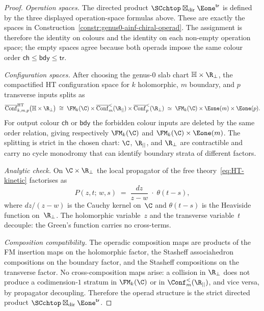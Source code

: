 \begin{proof}
\emph{Operation spaces.}
The directed product
$\SCchtop\boxtimes_{\mathrm{dir}}\Eone^{\mathsf{tr}}$ is defined by the
three displayed operation-space formulas above. These are exactly
the spaces in Construction~\ref{constr:genus0-ainf-chiral-operad}.
The assignment is therefore the identity on colours and the identity
on each non-empty operation space; the empty spaces agree because both
operads impose the same colour order
$\mathsf{ch}\leq\mathsf{bdy}\leq\mathsf{tr}$.

\medskip\noindent
\emph{Configuration spaces.}
After choosing the genus-$0$ slab chart
$\mathbb H\times\R_{\perp}$, the compactified HT configuration space
for $k$ holomorphic, $m$ boundary, and $p$ transverse inputs splits as
\[
 \overline{\mathrm{Conf}}^{\mathrm{HT}}_{k,m,p}
 \bigl(\mathbb H \times \R_{\perp}\bigr)
 \;\cong\;
 \FM_k(\C)\times
 \overline{\mathrm{Conf}}^{<}_m(\R_{||})\times
 \overline{\mathrm{Conf}}^{<}_p(\R_{\perp})
 \;\simeq\;
 \FM_k(\C)\times\Eone(m)\times\Eone(p).
\]
For output colour $\mathsf{ch}$ or $\mathsf{bdy}$ the forbidden colour
inputs are deleted by the same order relation, giving respectively
$\FM_k(\C)$ and $\FM_k(\C)\times\Eone(m)$.  The splitting is strict in
the chosen chart: $\C$, $\R_{||}$, and $\R_{\perp}$ are contractible and
carry no cycle monodromy that can identify boundary strata of different
factors.

\medskip\noindent
\emph{Analytic check.}
On $\C \times \R_{\perp}$ the local
propagator of the free theory~\eqref{eq:HT-kinetic}
factorises as
\[
 P(z,t;\, w,s)
 \;=\;
 \frac{dz}{z - w}
 \;\cdot\;
 \theta(t - s),
\]
where $dz/(z-w)$ is the Cauchy kernel on~$\C$ and
$\theta(t-s)$ is the Heaviside function on~$\R_{\perp}$.
The holomorphic variable~$z$ and the transverse variable~$t$
decouple: the Green's function carries no cross-terms.

\medskip\noindent
\emph{Composition compatibility.}
The operadic composition maps are products of the FM insertion
maps on the holomorphic factor, the Stasheff associahedron
compositions on the boundary factor, and the Stasheff
compositions on the transverse factor. No cross-composition maps
arise: a collision in $\R_{\perp}$ does not produce a
codimension-$1$ stratum in $\FM_k(\C)$ or in $\Conf_m^<(\R_{||})$,
and vice versa, by propagator decoupling.
Therefore the operad structure is the strict directed product
$\SCchtop\boxtimes_{\mathrm{dir}}\Eone^{\mathsf{tr}}$.
\end{proof}

